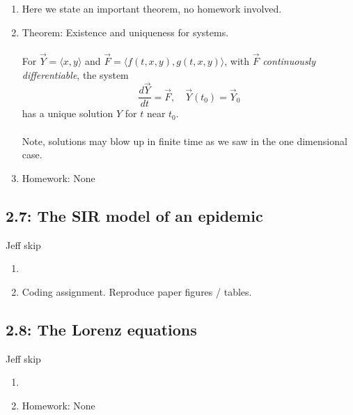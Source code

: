 \documentclass{article}
\begin{document}
\begin{enumerate}

\item Here we state an important theorem, no homework involved.

\item Theorem: Existence and uniqueness for systems. \\ \ \\
For $\vec{Y} = \langle x,y \rangle$ and $\vec{F} = \langle f(t,x,y), g(t,x,y) \rangle$, with $\vec{F}$ \emph{continuously differentiable}, the system
\[
\frac{d\vec{Y}}{dt} = \vec{F}, \quad \vec{Y}(t_0)=\vec{Y}_0
\] 
has a unique solution $Y$ for $t$ near $t_0$. \\ \ \\
Note, solutions may blow up in finite time as we saw in the one dimensional case.



\item Homework: None

\end{enumerate}

\subsection{2.7: The SIR model of an epidemic}
Jeff skip

\begin{enumerate}

\item 

\item Coding assignment. Reproduce paper figures / tables.

\end{enumerate}

\subsection{2.8: The Lorenz equations}
Jeff skip

\begin{enumerate}

\item 

\item Homework: None

\end{enumerate}
\end{document}
